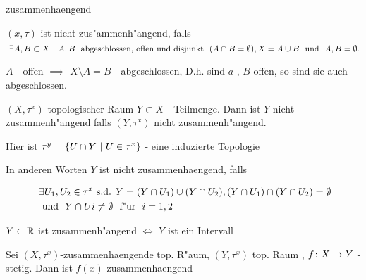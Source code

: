 \documentclass[class=article, crop=false]{standalone}
\begin{document}
\begin{zettel}{zusammenhaengend}
\begin{flashcard}
    \begin{definition}
        $(x,\tau)$ ist nicht zus"ammenh"angend, falls
\[
\exists  A,B \subset X \quad A,B  \tx{ abgeschlossen, offen und disjunkt } (A \cap B =  \emptyset), X =  A \cup B \tx{ und } A,B = \emptyset
.\]
\begin{remark}
$A$ - offen $\implies $ $X \setminus A =  B$ - abgeschlossen, D.h. sind $a$ , $B$ offen, so sind sie auch abgeschlossen.
\end{remark}
    \end{definition}
\end{flashcard}
\begin{definition}
    $(X,\tau^x)$ topologischer Raum $Y \subset X$ - Teilmenge. Dann ist $Y$ nicht zusammenh"angend falls $ (Y,\tau^x)$ nicht zusammenh"angend.

    Hier ist $\tau^y =  \set{U \cap Y}{U \in  \tau^x}$ - eine induzierte Topologie

    In anderen Worten $Y$ ist nicht zusammenhaengend, falls

    \begin{align*}
    &\exists U_1 , U_2 \in  \tau^x \text{ s.d. } Y = ( Y \cap U_1 ) \cup ( Y \cap U_2), ( Y \cap U_1 ) \cap ( Y \cap U_2) = \emptyset \\
    &\tx{ und } Y \cap Ui \neq  \emptyset \tx{ f"ur } i = 1,2
    \end{align*}
\end{definition}
\end{zettel}

\begin{lemma}
$Y \subset \mathbb{R} $ ist zusammenh"angend $\iff $ $Y$ ist ein Intervall
\end{lemma}

\begin{theorem}
Sei $(X,\tau^x)$-zusammenhaengende top. R"aum, $ (Y,\tau^x)$ top. Raum , $f \colon X\to Y $ - stetig. Dann ist $f(x)$ zusammenhaengend
\end{theorem}
\end{document}
